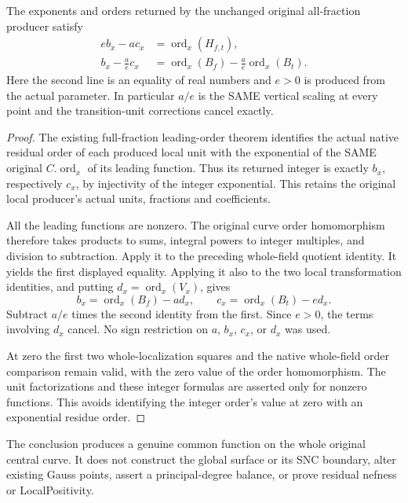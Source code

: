 \begin{theorem}
\label{thm:gauss-leading-corrected-curve-order}
\leanok
The exponents and orders returned by the unchanged original all-fraction
producer satisfy
\[
 \begin{split}
  e b_x-a c_x&=\operatorname{ord}_x(H_{f,t}),\\
  b_x-\frac ae c_x
   &=\operatorname{ord}_x(B_f)-\frac ae\operatorname{ord}_x(B_t).
 \end{split}
\]
Here the second line is an equality of real numbers and $e>0$ is produced
from the actual parameter. In particular $a/e$ is the SAME vertical
scaling at every point and the transition-unit corrections cancel exactly.
\end{theorem}
\begin{proof}
The existing full-fraction leading-order theorem identifies the actual
native residual order of each produced local unit with the exponential
of the SAME original $C.\operatorname{ord}_x$ of its leading function.
Thus its returned integer is exactly $b_x$, respectively $c_x$, by
injectivity of the integer exponential. This retains the original
local producer's actual units, fractions and coefficients.

All the leading functions are nonzero. The original curve order
homomorphism therefore takes products to sums, integral powers to
integer multiples, and division to subtraction. Apply it to the
preceding whole-field quotient identity. It yields the first displayed
equality. Applying it also to the two local transformation identities,
and putting $d_x=\operatorname{ord}_x(V_x)$, gives
\[
 b_x=\operatorname{ord}_x(B_f)-a d_x,\qquad
 c_x=\operatorname{ord}_x(B_t)-e d_x.
\]
Subtract $a/e$ times the second identity from the first. Since $e>0$,
the terms involving $d_x$ cancel. No sign restriction
on $a$, $b_x$, $c_x$, or $d_x$ was used.

At zero the first two whole-localization squares and the native
whole-field order comparison remain valid, with the zero value of the
order homomorphism. The unit factorizations and these integer formulas
are asserted only for nonzero functions. This avoids identifying the
integer order's value at zero with an exponential residue order.
\end{proof}

The conclusion produces a genuine common function on the whole original
central curve. It does not construct the global surface or its SNC
boundary, alter existing Gauss points, assert a principal-degree balance,
or prove residual nefness or LocalPositivity.
